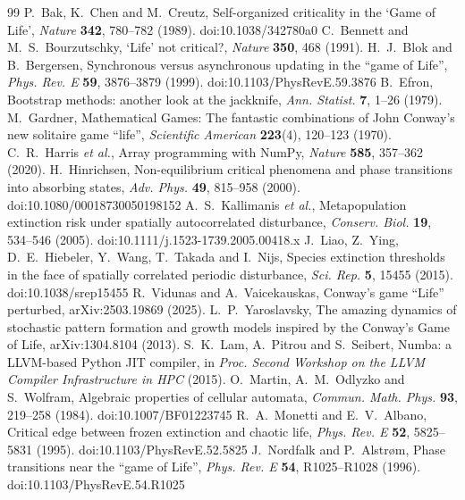 \documentclass[11pt,a4paper]{article}
\begin{document}
\begin{thebibliography}{99}\small
{} P.~Bak, K.~Chen and M.~Creutz, Self-organized criticality in the `Game of Life', \emph{Nature} \textbf{342}, 780--782 (1989). doi:10.1038/342780a0
 C.~Bennett and M.~S.~Bourzutschky, `Life' not critical?, \emph{Nature} \textbf{350}, 468 (1991).
 H.~J.~Blok and B.~Bergersen, Synchronous versus asynchronous updating in the ``game of Life'', \emph{Phys. Rev. E} \textbf{59}, 3876--3879 (1999). doi:10.1103/PhysRevE.59.3876
 B.~Efron, Bootstrap methods: another look at the jackknife, \emph{Ann. Statist.} \textbf{7}, 1--26 (1979).
 M.~Gardner, Mathematical Games: The fantastic combinations of John Conway's new solitaire game ``life'', \emph{Scientific American} \textbf{223}(4), 120--123 (1970).
 C.~R.~Harris \emph{et al.}, Array programming with NumPy, \emph{Nature} \textbf{585}, 357--362 (2020).
 H.~Hinrichsen, Non-equilibrium critical phenomena and phase transitions into absorbing states, \emph{Adv. Phys.} \textbf{49}, 815--958 (2000). doi:10.1080/00018730050198152
 A.~S.~Kallimanis \emph{et al.}, Metapopulation extinction risk under spatially autocorrelated disturbance, \emph{Conserv. Biol.} \textbf{19}, 534--546 (2005). doi:10.1111/j.1523-1739.2005.00418.x
 J.~Liao, Z.~Ying, D.~E.~Hiebeler, Y.~Wang, T.~Takada and I.~Nijs, Species extinction thresholds in the face of spatially correlated periodic disturbance, \emph{Sci. Rep.} \textbf{5}, 15455 (2015). doi:10.1038/srep15455
 R.~Vidunas and A.~Vaicekauskas, Conway's game ``Life'' perturbed, arXiv:2503.19869 (2025).
 L.~P.~Yaroslavsky, The amazing dynamics of stochastic pattern formation and growth models inspired by the Conway's Game of Life, arXiv:1304.8104 (2013).
 S.~K.~Lam, A.~Pitrou and S.~Seibert, Numba: a LLVM-based Python JIT compiler, in \emph{Proc. Second Workshop on the LLVM Compiler Infrastructure in HPC} (2015).
 O.~Martin, A.~M.~Odlyzko and S.~Wolfram, Algebraic properties of cellular automata, \emph{Commun. Math. Phys.} \textbf{93}, 219--258 (1984). doi:10.1007/BF01223745
 R.~A.~Monetti and E.~V.~Albano, Critical edge between frozen extinction and chaotic life, \emph{Phys. Rev. E} \textbf{52}, 5825--5831 (1995). doi:10.1103/PhysRevE.52.5825
 J.~Nordfalk and P.~Alstr{\o}m, Phase transitions near the ``game of Life'', \emph{Phys. Rev. E} \textbf{54}, R1025--R1028 (1996). doi:10.1103/PhysRevE.54.R1025

\end{thebibliography}
\end{document}
